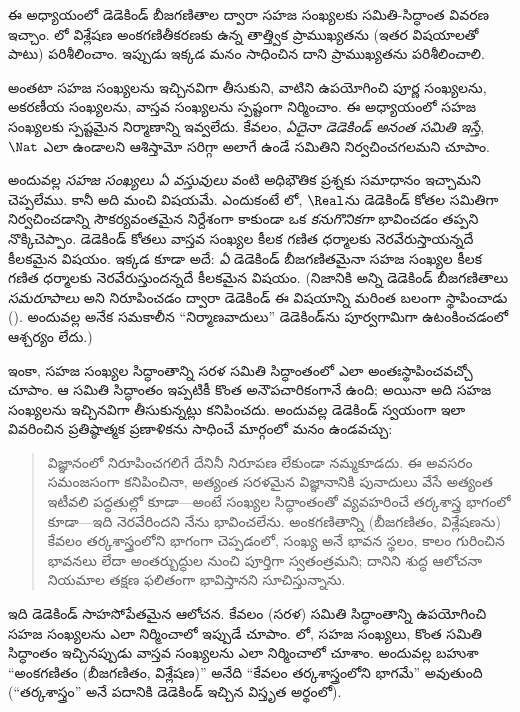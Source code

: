 \documentclass[../../../include/open-logic-section]{subfiles}
\begin{document}


ఈ అధ్యాయంలో డెడెకిండ్ బీజగణితాల ద్వారా సహజ సంఖ్యలకు సమితి-సిద్ధాంత
వివరణ ఇచ్చాం. లో విశ్లేషణ
అంకగణితీకరణకు ఉన్న తాత్త్విక ప్రాముఖ్యతను (ఇతర విషయాలతో పాటు)
పరిశీలించాం. ఇప్పుడు ఇక్కడ మనం సాధించిన దాని ప్రాముఖ్యతను పరిశీలించాలి.

 అంతటా సహజ సంఖ్యలను ఇచ్చినవిగా తీసుకుని,
వాటిని ఉపయోగించి పూర్ణ సంఖ్యలను, అకరణీయ సంఖ్యలను, వాస్తవ సంఖ్యలను స్పష్టంగా నిర్మించాం.
ఈ అధ్యాయంలో సహజ సంఖ్యలకు స్పష్టమైన నిర్మాణాన్ని ఇవ్వలేదు. కేవలం,
\emph{ఏదైనా డెడెకిండ్ అనంత సమితి ఇస్తే}, $\Nat$ ఎలా
ఉండాలని ఆశిస్తామో సరిగ్గా అలాగే ఉండే సమితిని
నిర్వచించగలమని చూపాం.

అందువల్ల \emph{సహజ సంఖ్యలు ఏ వస్తువులు} వంటి అధిభౌతిక ప్రశ్నకు
సమాధానం ఇచ్చామని చెప్పలేము. కానీ అది మంచి విషయమే. ఎందుకంటే
లో, $\Real$ను డెడెకిండ్ కోతల సమితిగా
నిర్వచించడాన్ని సౌకర్యవంతమైన నిర్దేశంగా కాకుండా ఒక \emph{కనుగొనికగా}
భావించడం తప్పని నొక్కిచెప్పాం. డెడెకిండ్ కోతలు వాస్తవ సంఖ్యల కీలక
గణిత ధర్మాలకు నెరవేరుస్తాయన్నదే కీలకమైన విషయం. ఇక్కడ కూడా అదే:
\emph{ఏ} డెడెకిండ్ బీజగణితమైనా సహజ సంఖ్యల కీలక గణిత ధర్మాలకు
నెరవేరుస్తుందన్నదే కీలకమైన విషయం. (నిజానికి అన్ని డెడెకిండ్
బీజగణితాలు \emph{సమరూపాలు} అని నిరూపించడం ద్వారా డెడెకిండ్ ఈ విషయాన్ని
మరింత బలంగా స్థాపించాడు (\citeyear[Theorems
132--3]{Dedekind1888}).
అందువల్ల అనేక సమకాలీన ``నిర్మాణవాదులు'' డెడెకిండ్‌ను పూర్వగామిగా
ఉటంకించడంలో ఆశ్చర్యం లేదు.)

ఇంకా, సహజ సంఖ్యల సిద్ధాంతాన్ని సరళ సమితి సిద్ధాంతంలో ఎలా
అంతఃస్థాపించవచ్చో చూపాం. ఆ సమితి సిద్ధాంతం ఇప్పటికీ కొంత అనౌపచారికంగానే ఉంది;
అయినా అది సహజ సంఖ్యలను ఇచ్చినవిగా తీసుకున్నట్లు కనిపించదు. అందువల్ల
డెడెకిండ్ స్వయంగా ఇలా వివరించిన ప్రతిష్ఠాత్మక ప్రణాళికను సాధించే
మార్గంలో మనం ఉండవచ్చు:
\begin{quote}
	విజ్ఞానంలో నిరూపించగలిగే దేనినీ నిరూపణ లేకుండా నమ్మకూడదు. ఈ
	అవసరం సమంజసంగా కనిపించినా, అత్యంత సరళమైన విజ్ఞానానికి పునాదులు వేసే
	అత్యంత ఇటీవలి పద్ధతుల్లో కూడా---అంటే సంఖ్యల సిద్ధాంతంతో వ్యవహరించే
	తర్కశాస్త్ర భాగంలో కూడా---ఇది నెరవేరిందని నేను భావించలేను.
	అంకగణితాన్ని (బీజగణితం, విశ్లేషణను) కేవలం తర్కశాస్త్రంలోని భాగంగా
	చెప్పడంలో, సంఖ్య అనే భావన స్థలం, కాలం గురించిన భావనలు లేదా
	అంతర్బుద్ధుల నుంచి పూర్తిగా స్వతంత్రమని; దానిని శుద్ధ ఆలోచనా
	నియమాల తక్షణ ఫలితంగా భావిస్తానని సూచిస్తున్నాను.
	\citep[preface]{Dedekind1888}
\end{quote}
ఇది డెడెకిండ్ సాహసోపేతమైన ఆలోచన. కేవలం (సరళ) సమితి సిద్ధాంతాన్ని
ఉపయోగించి సహజ సంఖ్యలను ఎలా నిర్మించాలో ఇప్పుడే చూపాం.
లో, సహజ సంఖ్యలు, కొంత సమితి సిద్ధాంతం
ఇచ్చినప్పుడు వాస్తవ సంఖ్యలను ఎలా నిర్మించాలో చూశాం. అందువల్ల బహుశా
``అంకగణితం (బీజగణితం, విశ్లేషణ)'' అనేది ``కేవలం తర్కశాస్త్రంలోని
భాగమే'' అవుతుంది (``తర్కశాస్త్రం'' అనే పదానికి డెడెకిండ్ ఇచ్చిన
విస్తృత అర్థంలో).
\end{document}
